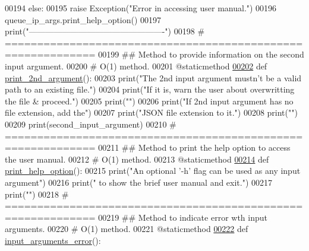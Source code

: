 \begin{DoxyCode}
00194         \textcolor{keywordflow}{else}:
00195             \textcolor{keywordflow}{raise} Exception(\textcolor{stringliteral}{"Error in accessing user manual."})
00196         queue\_ip\_args.print\_help\_option()
00197         print(\textcolor{stringliteral}{"-------------------------------------------------"})
00198     \textcolor{comment}{# ============================================================}
00199     \textcolor{comment}{##  Method to provide information on the second input argument.}
00200     \textcolor{comment}{#   O(1) method.}
00201     @staticmethod
\hypertarget{queue__ip__arguments_8py_source_l00202}{}\hyperlink{classutilities_1_1queue__ip__arguments_1_1queue__ip__args_a6311efe4f2f6ac8c64c9b442e8854ab7}{00202}     \textcolor{keyword}{def }\hyperlink{classutilities_1_1queue__ip__arguments_1_1queue__ip__args_a6311efe4f2f6ac8c64c9b442e8854ab7}{print\_2nd\_argument}():
00203         print(\textcolor{stringliteral}{"The 2nd input argument mustn't be a valid path to an existing file."})
00204         print(\textcolor{stringliteral}{"If it is, warn the user about overwritting the file & proceed."})
00205         print(\textcolor{stringliteral}{""})
00206         print(\textcolor{stringliteral}{"If 2nd input argument has no file extension, add the"})
00207         print(\textcolor{stringliteral}{"JSON file extension to it."})
00208         print(\textcolor{stringliteral}{""})
00209         print(second\_input\_argument)
00210     \textcolor{comment}{# ============================================================}
00211     \textcolor{comment}{##  Method to print the help option to access the user manual.}
00212     \textcolor{comment}{#   O(1) method.}
00213     @staticmethod
\hypertarget{queue__ip__arguments_8py_source_l00214}{}\hyperlink{classutilities_1_1queue__ip__arguments_1_1queue__ip__args_a28c79307da87e28e9ac3467290fd5738}{00214}     \textcolor{keyword}{def }\hyperlink{classutilities_1_1queue__ip__arguments_1_1queue__ip__args_a28c79307da87e28e9ac3467290fd5738}{print\_help\_option}():
00215         print(\textcolor{stringliteral}{"An optional '-h' flag can be used as any input argument"})
00216         print(\textcolor{stringliteral}{" to show the brief user manual and exit."})
00217         print(\textcolor{stringliteral}{""})
00218     \textcolor{comment}{# ============================================================}
00219     \textcolor{comment}{##  Method to indicate error wth input arguments.}
00220     \textcolor{comment}{#   O(1) method.}
00221     @staticmethod
\hypertarget{queue__ip__arguments_8py_source_l00222}{}\hyperlink{classutilities_1_1queue__ip__arguments_1_1queue__ip__args_afdfbfffba8afb5e786283dd22d856e93}{00222}     \textcolor{keyword}{def }\hyperlink{classutilities_1_1queue__ip__arguments_1_1queue__ip__args_afdfbfffba8afb5e786283dd22d856e93}{input\_arguments\_error}():

\end{DoxyCode}
